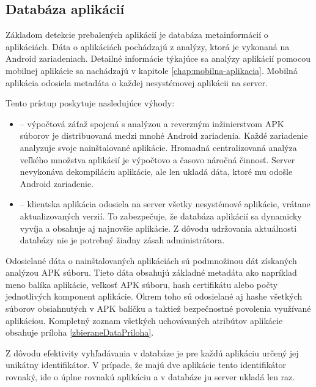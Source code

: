 \subsection{Databáza aplikácií}

Základom detekcie prebalených aplikácií je databáza metainformácií o aplikáciách. Dáta o aplikáciách pochádzajú z analýzy, ktorá je vykonaná na Android zariadeniach. Detailné informácie týkajúce sa analýzy aplikácií pomocou mobilnej aplikácie  sa nachádzajú v kapitole \ref{chap:mobilna-aplikacia}. Mobilná aplikácia odosiela metadáta o každej nesystémovej aplikácii na server.

 
\noindent Tento prístup poskytuje nasledujúce výhody:
\begin{itemize}
	\item {} -- výpočtová záťaž spojená s analýzou a reverzným inžinierstvom APK súborov je distribuovaná medzi mnohé Android zariadenia. Každé zariadenie analyzuje svoje nainštalované aplikácie. Hromadná centralizovaná analýza veľkého množstva aplikácií je výpočtovo a časovo náročná činnosť. Server nevykonáva dekompiláciu aplikácie, ale len ukladá dáta, ktoré mu odošle Android zariadenie.
	\item {} -- klientska aplikácia odosiela na server všetky nesystémové aplikácie, vrátane aktualizovaných verzií. To zabezpečuje, že databáza aplikácií sa dynamicky vyvíja a obsahuje aj najnovšie aplikácie. Z dôvodu udržovania aktuálnosti databázy nie je potrebný žiadny zásah administrátora.
\end{itemize}

\noindent Odosielané dáta o nainštalovaných aplikáciách sú podmnožinou dát získaných analýzou APK súboru. Tieto dáta obsahujú základné metadáta ako napríklad meno balíka aplikácie, veľkosť APK súboru, hash certifikátu alebo počty jednotlivých komponent aplikácie. Okrem toho sú odosielané aj hashe všetkých  súborov obsiahnutých v APK balíčku a taktiež bezpečnostné povolenia využívané aplikáciou. Kompletný zoznam všetkých uchovávaných atribútov aplikácie obsahuje príloha \ref{zbieraneDataPriloha}.

Z dôvodu efektivity vyhľadávania v databáze je pre každú aplikáciu určený jej unikátny identifikátor. V prípade, že majú dve aplikácie tento identifikátor rovnaký, ide o úplne rovnakú aplikáciu a v databáze ju server ukladá len raz.



